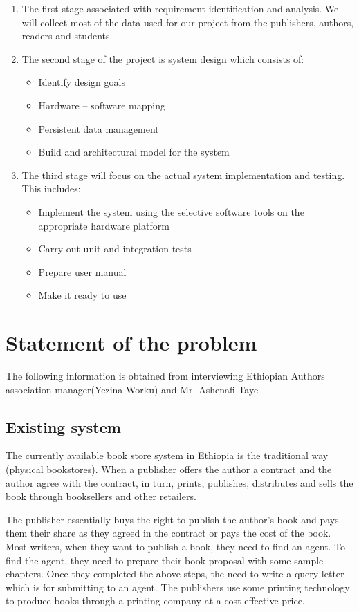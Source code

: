 \begin{enumerate}
	\item The first stage associated with requirement identification and analysis. We will collect most of the data used for our project from the publishers, authors, readers and students.
	
	\item The second stage of the project is system design which consists of:	
	\begin{itemize}
		\item Identify design goals
		\item Hardware – software mapping
		\item Persistent data management
		\item Build and architectural model for the system
	\end{itemize}

	\item The third stage will focus on the actual system implementation and testing. This includes:
	\begin{itemize}
		\item Implement the system using the selective software tools on the appropriate hardware platform
		\item Carry out unit and integration tests
		\item Prepare user manual
		\item Make it ready to use
	\end{itemize}
\end{enumerate}


\section{Statement of the problem}
The following information is obtained from interviewing Ethiopian Authors association manager(Yezina Worku) and Mr. Ashenafi Taye 
	\subsection{Existing system}

The currently available book store system in Ethiopia is the traditional way (physical bookstores). When a publisher offers the author a contract and the author agree with the contract, in turn, prints, publishes, distributes and sells the book through booksellers and other retailers.

The publisher essentially buys the right to publish the author's book and pays them their share as they agreed in the contract or pays the cost of the book. Most writers, when they want to publish a book, they need to find an agent. To find the agent, they need to prepare their book proposal with some sample chapters. Once they completed the above steps, the need to write a query letter which is for submitting to an agent. The publishers use some printing technology to produce books through a printing company at a cost-effective price.

